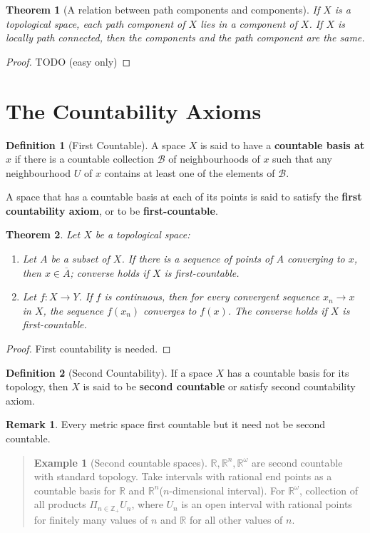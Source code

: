 \documentclass[12pt,reqno]{amsart}
\theoremstyle{plain}
\newtheorem{thm}{Theorem}
\theoremstyle{definition}
\newtheorem{defn}{Definition}
\newtheorem{eg}{Example}
\newtheorem{rem}{Remark}
\newcommand{\bb}[1]{\mathbb{#1}}
\newcommand{\cal}[1]{\mathcal{#1}}
\begin{document}
\begin{thm}[A relation between path components and components]
    If $X$ is a topological space, each path component of $X$ lies in a component of $X$. If $X$ is locally path connected, then the components and the path component are the same.
\end{thm}
\begin{proof}
    TODO (easy only)
\end{proof}
\section{The Countability Axioms}
\begin{defn}[First Countable]
    A space $X$ is said to have a {\bf countable basis at $x$} if there is a countable collection $\cal B$ of neighbourhoods of $x$ such that any neighbourhood $U$ of $x$ contains at least one of the elements of $\cal B$.
    
    A space that has a countable basis at each of its points is said to satisfy the {\bf first countability axiom}, or to be {\bf first-countable}.
\end{defn}
\begin{thm}
    Let $X$ be a topological space:
    \begin{enumerate}
        \item Let $A$ be a subset of $X$. If there is a sequence of points of $A$ converging to $x$, then $x \in \overline{A}$; converse holds if $X$ is first-countable.
        \item Let $f \colon X \to Y$. If $f$ is continuous, then for every convergent sequence $x_n \to x$ in $X$, the sequence $f(x_n)$ converges to $f(x)$. The converse holds if $X$ is first-countable.
    \end{enumerate}
\end{thm}
\begin{proof}
    First countability is needed.
\end{proof}
\begin{defn}[Second Countability]
    If a space $X$ has a countable basis for its topology, then $X$ is said to be {\bf second countable} or satisfy second countability axiom.
\end{defn}
\begin{rem}
    Every metric space first countable but it need not be second countable.    
\end{rem}
\begin{quotation}
\begin{eg}[Second countable spaces]
    $\bb R, \bb R^n, \bb R^{\omega}$ are second countable with standard topology. Take intervals with rational end points as a countable basis for $\bb R$ and $\bb R^n$($n$-dimensional interval). For $\bb R^\omega$, collection of all products $\Pi_{n\in \bb Z_+} U_n$, where $U_n$ is an open interval with rational points for finitely many values of $n$ and $\bb R$ for all other values of $n$.
\end{eg}
\end{quotation}
\end{document}
